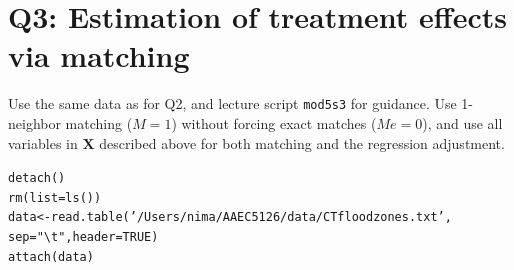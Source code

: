 \documentclass[11pt,reqno]{amsart}\usepackage[]{graphicx}\usepackage[]{color}
\makeatletter
\newcommand{\hlnum}[1]{\textcolor[rgb]{0.063,0.58,0.627}{#1}}%
\newcommand{\hlstr}[1]{\textcolor[rgb]{0.063,0.58,0.627}{#1}}%
\newcommand{\hlstd}[1]{\textcolor[rgb]{0.196,0.196,0.196}{#1}}%
\newcommand{\hlkwb}[1]{\textcolor[rgb]{0.627,0,0.314}{#1}}%
\newcommand{\hlkwc}[1]{\textcolor[rgb]{0,0.631,0.314}{#1}}%
\newcommand{\hlkwd}[1]{\textcolor[rgb]{0.78,0.227,0.412}{#1}}%
\newenvironment{kframe}{%
 \def\at@end@of@kframe{}%
 \ifinner\ifhmode%
  \def\at@end@of@kframe{\end{minipage}}%
  \begin{minipage}{\columnwidth}%
 \fi\fi%
 \def\FrameCommand##1{\hskip\@totalleftmargin \hskip-\fboxsep
 \colorbox{shadecolor}{##1}\hskip-\fboxsep
     \hskip-\linewidth \hskip-\@totalleftmargin \hskip\columnwidth}%
 \MakeFramed {\advance\hsize-\width
   \@totalleftmargin\z@ \linewidth\hsize
   \@setminipage}}%
 {\par\unskip\endMakeFramed%
 \at@end@of@kframe}
\newenvironment{knitrout}{}{} %
\newcommand{\mlt}[1]{\mathbf{#1}} %
\newcommand{\ksp}{\vspace{0.1in}}   %
\newcommand{\kX}{\mlt{X}}
\makeatother
\begin{document}
\clearpage
\newpage
\section{Q3: Estimation of treatment effects via matching}
Use the same data as for Q2, and lecture script \texttt{mod5s3} for guidance. Use 1-neighbor matching ($M=1$) without forcing exact matches ($Me=0$), and use all variables in $\kX$ described above for both matching and the regression adjustment.\\

\begin{knitrout}
\color{fgcolor}\begin{kframe}
\begin{alltt}
\hlkwd{detach}\hlstd{()}
\hlkwd{rm}\hlstd{(}\hlkwc{list}\hlstd{=}\hlkwd{ls}\hlstd{())}
\hlstd{data} \hlkwb{<-} \hlkwd{read.table}\hlstd{(}\hlstr{'/Users/nima/AAEC5126/data/CTfloodzones.txt'}\hlstd{,}
                   \hlkwc{sep} \hlstd{=} \hlstr{"\textbackslash{}t"}\hlstd{,} \hlkwc{header} \hlstd{=} \hlnum{TRUE}\hlstd{)}
\hlkwd{attach}\hlstd{(data)}
\end{alltt}
\end{kframe}
\end{knitrout}
\ksp
\end{document}

